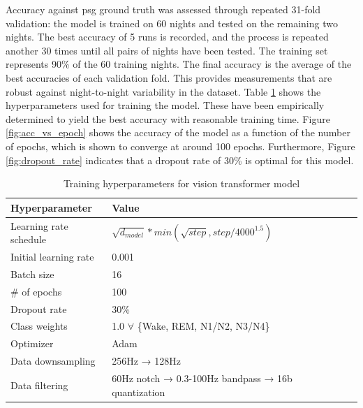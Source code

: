 Accuracy against \ac{psg} ground truth was assessed through repeated 31-fold validation: the model is trained on 60 nights and tested on the remaining two nights. The best accuracy of 5 runs is
recorded, and the process is repeated another 30 times until all pairs of nights have been tested. The training set represents 90\% of the 60 training nights. The final accuracy is the average
of the best accuracies of each validation fold. This provides measurements that are robust against night-to-night variability in the dataset. Table \ref{tab:training_hyperparameters} shows the
hyperparameters used for training the model. These have been empirically determined to yield the best accuracy with reasonable training time. Figure \ref{fig:acc_vs_epoch} shows the accuracy of
the model as a function of the number of epochs, which is shown to converge at around 100 epochs. Furthermore, Figure \ref{fig:dropout_rate} indicates that a dropout rate of 30\% is optimal for
this model.

\begin{table}[ht]
    \centering
    \renewcommand{\arraystretch}{1.2} %
    \setlength{\arrayrulewidth}{1.5pt} %
    \caption{Training hyperparameters for vision transformer model}
    \begin{tabular}{@{} *5l @{}}
        Hyperparameter                  & Value &&&     \\\toprule
        Learning rate schedule          & $\sqrt{d_{model}}*min(\sqrt{step}, step/4000^{1.5})$ \\
        Initial learning rate           & 0.001        \\
        Batch size                      & 16            \\
        \# of epochs                    & 100           \\
        Dropout rate                    & 30\%          \\
        Class weights                   & 1.0 $\forall$ \{Wake, REM, N1/N2, N3/N4\} \\
        Optimizer                       & Adam          \\
        Data downsampling               & 256Hz → 128Hz \\
        Data filtering                  & 60Hz notch → 0.3-100Hz bandpass → 16b quantization \\            
        \hline
    \end{tabular}
    \label{tab:training_hyperparameters}
\end{table}


